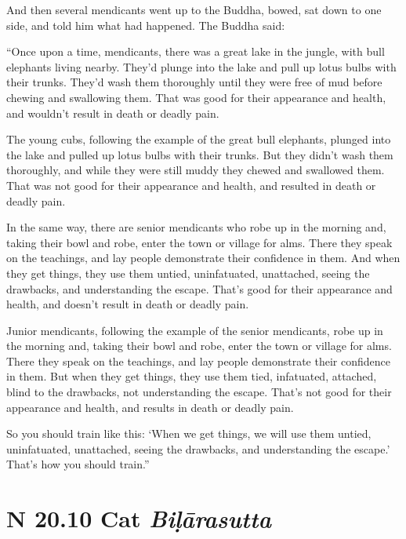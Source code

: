 \documentclass[12pt,openany]{book}%
\newcommand*{\suttatitleacronym}[1]{\smaller[2]{#1}\vspace*{.3em}}
\newcommand*{\suttatitletranslation}[1]{\linebreak{#1}}
\newcommand*{\suttatitleroot}[1]{\linebreak\smaller[2]\itshape{#1}}
\newcommand*{\tocacronym}[1]{\hspace*{-3.3em}{#1}\quad}
\newcommand*{\toctranslation}[1]{#1}
\newcommand*{\tocroot}[1]{(\textit{#1})}
\begin{document}
And then several mendicants went up to the Buddha, bowed, sat down to one side, and told him what had happened. The Buddha said: 

“Once upon a time, mendicants, there was a great lake in the jungle, with bull elephants living nearby. They’d plunge into the lake and pull up lotus bulbs with their trunks. They’d wash them thoroughly until they were free of mud before chewing and swallowing them. That was good for their appearance and health, and wouldn’t result in death or deadly pain. 

The young cubs, following the example of the great bull elephants, plunged into the lake and pulled up lotus bulbs with their trunks. But they didn’t wash them thoroughly, and while they were still muddy they chewed and swallowed them. That was not good for their appearance and health, and resulted in death or deadly pain. 

In the same way, there are senior mendicants who robe up in the morning and, taking their bowl and robe, enter the town or village for alms. There they speak on the teachings, and lay people demonstrate their confidence in them. And when they get things, they use them untied, uninfatuated, unattached, seeing the drawbacks, and understanding the escape. That’s good for their appearance and health, and doesn’t result in death or deadly pain. 

Junior mendicants, following the example of the senior mendicants, robe up in the morning and, taking their bowl and robe, enter the town or village for alms. There they speak on the teachings, and lay people demonstrate their confidence in them. But when they get things, they use them tied, infatuated, attached, blind to the drawbacks, not understanding the escape. That’s not good for their appearance and health, and results in death or deadly pain. 

So you should train like this: ‘When we get things, we will use them untied, uninfatuated, unattached, seeing the drawbacks, and understanding the escape.’ That’s how you should train.” 

%
\section*{{\suttatitleacronym SN 20.10}{\suttatitletranslation A Cat }{\suttatitleroot Biḷārasutta}}
\addcontentsline{toc}{section}{\tocacronym{SN 20.10} \toctranslation{A Cat } \tocroot{Biḷārasutta}}
\end{document}
